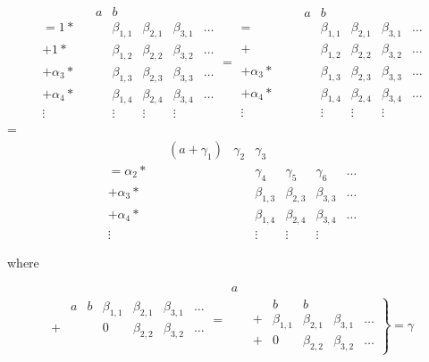 \documentclass{cs4rep}
\begin{document}
\[ \begin{array}{lcc|ccccc}
& & a & b \\
= 1 * & & & \beta_{1,1} & \beta_{2,1} & \beta_{3,1} & \ldots \\
+ 1 * & & & \beta_{1,2} & \beta_{2,2} & \beta_{3,2} & \ldots \\
+ \alpha_{3} * & & & \beta_{1,3} & \beta_{2,3} & \beta_{3,3} & \ldots \\
+ \alpha_{4} * & & & \beta_{1,4} & \beta_{2,4} & \beta_{3,4} & \ldots \\
\vdots & & & \vdots & \vdots & \vdots
\end{array}
=
\begin{array}{lccc|cccc}
& & & a & b \\
= & & & & \beta_{1,1} & \beta_{2,1} & \beta_{3,1} & \ldots \\
+ & & & & \beta_{1,2} & \beta_{2,2} & \beta_{3,2} & \ldots \\
+ \alpha_{3} * & & & & \beta_{1,3} & \beta_{2,3} & \beta_{3,3} & \ldots \\
+ \alpha_{4} * & & & & \beta_{1,4} & \beta_{2,4} & \beta_{3,4} & \ldots \\
\vdots & & & & \vdots & \vdots & \vdots
\end{array} 
\]
=
\[ \begin{array}{lccc|cccc}
& & ( a + \gamma_{1} ) & \gamma_{2} & \gamma_{3} \\
= \alpha_{2} * & & & & \gamma_{4} & \gamma_{5} & \gamma_{6} & \ldots \\
+ \alpha_{3} * & & & & \beta_{1,3} & \beta_{2,3} & \beta_{3,3} & \ldots \\
+ \alpha_{4} * & & & & \beta_{1,4} & \beta_{2,4} & \beta_{3,4} & \ldots \\
\vdots & & & & \vdots & \vdots & \vdots
\end{array} \]

where

\[
\begin{array}{lcccccc}
& a & b & \beta_{1,1} & \beta_{2,1} & \beta_{3,1} & \ldots \\
+ & & & 0 & \beta_{2,2} & \beta_{3,2} & \ldots
\end{array}
=
\begin{array}{cc}
a \\
& \left. { 
\begin{array}{lcccc}
& b & b \\
+ & \beta_{1,1} & \beta_{2,1} & \beta_{3,1} & \ldots \\
+ & 0 & \beta_{2,2} & \beta_{3,2} & \ldots
\end{array} } \right\} = \gamma
\end{array}
\]
\end{document}
